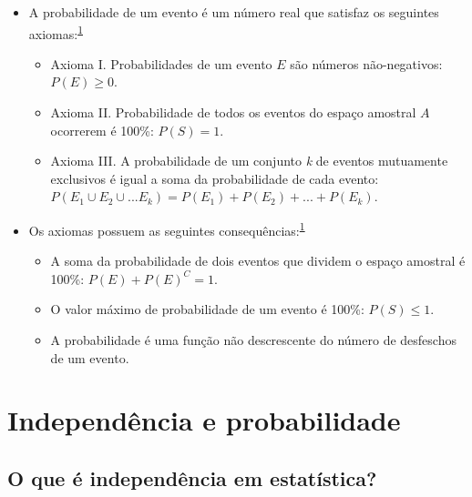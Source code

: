 \documentclass[
  a4paper,
]{book}
\begin{document}
\begin{itemize}
\item
  A probabilidade de um evento é um número real que satisfaz os seguintes axiomas:\textsuperscript{\protect\hyperlink{ref-grami2023}{1}}

  \begin{itemize}
  \item
    Axioma I. Probabilidades de um evento \(E\) são números não-negativos: \(P(E)≥0\).
  \item
    Axioma II. Probabilidade de todos os eventos do espaço amostral \(A\) ocorrerem é 100\%: \(P(S)=1\).
  \item
    Axioma III. A probabilidade de um conjunto \emph{k} de eventos mutuamente exclusivos é igual a soma da probabilidade de cada evento: \(P(E_{1} \cup E_{2} \cup ... E_{k}) = P(E_{1}) + P(E_{2}) + ... + P(E_{k})\).
  \end{itemize}
\item
  Os axiomas possuem as seguintes consequências:\textsuperscript{\protect\hyperlink{ref-grami2023}{1}}

  \begin{itemize}
  \item
    A soma da probabilidade de dois eventos que dividem o espaço amostral é 100\%: \(P(E)+P(E)^C=1\).
  \item
    O valor máximo de probabilidade de um evento é 100\%: \(P(S)≤1\).
  \item
    A probabilidade é uma função não descrescente do número de desfeschos de um evento.
  \end{itemize}
\end{itemize}

\hypertarget{independencia-probabilidade}{%
\section{Independência e probabilidade}\label{independencia-probabilidade}}

\hypertarget{o-que-uxe9-independuxeancia-em-estatuxedstica}{%
\subsection{O que é independência em estatística?}\label{o-que-uxe9-independuxeancia-em-estatuxedstica}}
\end{document}
